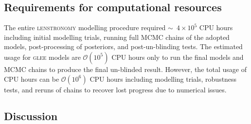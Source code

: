 \documentclass[longauth]{aa}
\begin{document}
\subsection{Requirements for computational resources} \label{sec:computational_requirement}

The entire \textsc{lenstronomy} modelling procedure required $\sim$~$4 \times 10^5$ CPU hours including initial modelling trials, running full MCMC chains of the adopted models, post-processing of posteriors, and post-un-blinding tests. The estimated usage for \textsc{glee} models are $\mathcal{O}(10^5)$ CPU hours only to run the final models and MCMC chains to produce the final un-blinded result. However, the total usage of CPU hours can be $\mathcal{O}(10^6)$ CPU hours including modelling trials, robustness tests, and reruns of chains to recover lost progress due to numerical issues. 

\subsection{Discussion} \label{sec:discussion}
\end{document}
